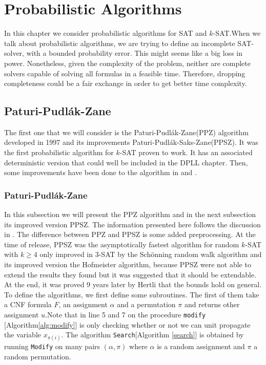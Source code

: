 \chapter{Probabilistic Algorithms}
\label{sec:prob}


In this chapter we consider probabilistic algorithms for SAT and $k$-SAT.When we talk about probabilistic algorithms, we are trying to define an incomplete SAT-solver, with a bounded probability error. This might seems like a big loss in power. Nonetheless, given the complexity of the problem, neither are complete solvers capable of solving all formulas in a feasible time. Therefore, dropping completeness could be a fair exchange in order to get better time complexity.\\


\section{Paturi-Pudlák-Zane}
The first one that we will consider is the Paturi-Pudlák-Zane(PPZ) algorithm \cite{paturi1997satisfiability} developed in 1997 and its improvements Paturi-Pudlák-Saks-Zane(PPSZ). It was the first probabilistic algorithm for $k$-SAT proven to work. It has an associated deterministic version that could well be included in the DPLL chapter. Then, some improvements have been done to the algorithm in \cite{paturi2005improved} and \cite{hertli20143}.\\

\subsection{Paturi-Pudlák-Zane}
\label{subsec:PPZ}
In this subsection we will present the PPZ algorithm and in the next subsection its improved version PPSZ. The information presented here follows the discussion in \cite{paturi2005improved}. The difference between PPZ and PPSZ is some added preprocessing. At the time of release, PPSZ was the asymptotically fastest algorithm for random $k$-SAT with $k \ge 4$ only improved in $3$-SAT by the Schönning random walk algorithm and its improved version the Hofmeister algorithm, because PPSZ were not able to extend the results they found but it was suggested that it should be extendable. At the end, it was proved 9 years later by Hertli \cite{hertli20143} that the bounds hold on general. \\


To define the algorithms, we first define some subroutines. The first of them take a CNF formula $F$, an assignment $\alpha$ and a permutation $\pi$ and returns other assignment $u$.Note that in line 5 and 7 on the procedure \texttt{modify} [Algorithm\ref{alg:modify}] is only checking whether or not we can unit propagate the variable $x_{\pi(i)}$. The algorithm \texttt{Search}[Algorithm \ref{search}] is obtained by running \texttt{Modify} on many pairs $(\alpha, \pi)$ where $\alpha$ is a random assignment and $\pi$ a random permutation.\\ 


